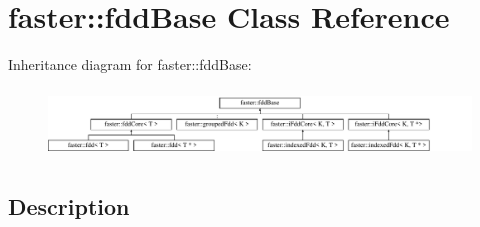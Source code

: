 \hypertarget{classfaster_1_1fddBase}{}\section{faster\+:\+:fdd\+Base Class Reference}
\label{classfaster_1_1fddBase}
Inheritance diagram for faster\+:\+:fdd\+Base\+:\begin{figure}[H]
\begin{center}
\leavevmode
\includegraphics[height=1.826087cm]{classfaster_1_1fddBase}
\end{center}
\end{figure}


\subsection{Description}
